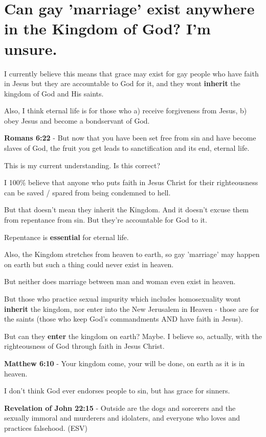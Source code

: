 \documentclass[11pt]{article}
\begin{document}
\section{Can gay 'marriage' exist anywhere in the Kingdom of God? I'm unsure.}
\label{sec:org5dcf234}
I currently believe this means that grace may
exist for gay people who have faith in Jesus
but they are accountable to God for it, and
they wont \textbf{inherit} the kingdom of God and His saints.

Also, I think eternal life is for those who a) receive forgiveness from Jesus, b) obey Jesus and become a bondservant of God.

\textbf{Romans 6:22} - But now that you have been set free from sin and have become slaves of God, the fruit you get leads to sanctification and its end, eternal life.

This is my current understanding. Is this correct?

I 100\% believe that anyone who puts faith in Jesus Christ for their righteousness can be saved / spared from being condemned to hell.

But that doesn't mean they inherit the Kingdom.
And it doesn't excuse them from repentance from sin.
But they're accountable for God to it.

Repentance is \textbf{essential} for eternal life.

Also, the Kingdom stretches from heaven to earth, so gay 'marriage' may happen on earth but such a thing could never exist in heaven.

But neither does marriage between man and woman even exist in heaven.

But those who practice sexual impurity which includes homosexuality wont \textbf{inherit} the kingdom, nor enter into the New Jerusalem in Heaven - those are for the saints (those who keep God's commandments AND have faith in Jesus).

But can they \textbf{enter} the kingdom on earth? Maybe. I believe so, actually, with the righteousness of God through faith in Jesus Christ.

\textbf{Matthew 6:10} - Your kingdom come, your will be done, on earth as it is in heaven.

I don't think God ever endorses people to sin, but has grace for sinners.

\textbf{Revelation of John 22:15} - Outside are the dogs and sorcerers and the sexually immoral and murderers and idolaters, and everyone who loves and practices falsehood. (ESV)
\end{document}
